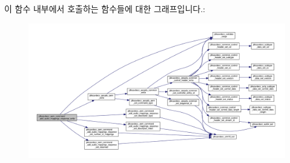 이 함수 내부에서 호출하는 함수들에 대한 그래프입니다.\+:
\nopagebreak
\begin{figure}[H]
\begin{center}
\leavevmode
\includegraphics[width=350pt]{group__command__add__audio__mappings__response_ga58c2a72ad5d205dbee4c0fb6efb5b2e7_cgraph}
\end{center}
\end{figure}


